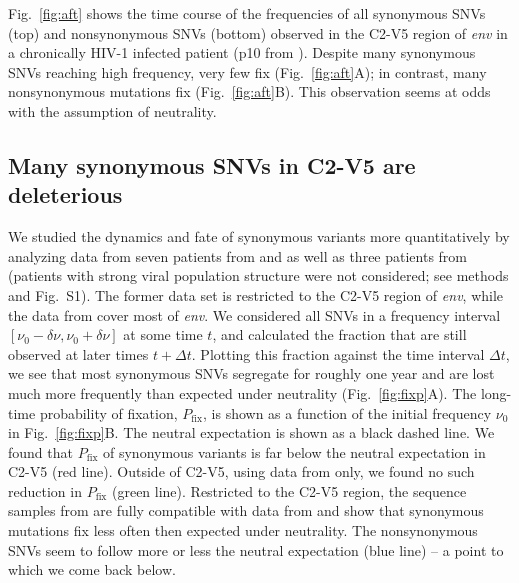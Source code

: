\documentclass[11pt]{article}
\newcommand{\pfix}{P_{\mathrm{fix}}}
\newcommand{\FIG}[1]{Fig.~\ref{fig:#1}}
\newcommand{\env}{\textit{env}}
\newcommand{\shankaregion}{C2-V5}
\newcommand{\PCApat}{1}
\begin{document}
\FIG{aft} shows the time course of the frequencies of all synonymous
SNVs (top) and nonsynonymous SNVs (bottom) observed in the
\shankaregion{} region of \env{} in a chronically HIV-1 infected patient (p10 from
\citet{shankarappa_consistent_1999}). Despite many synonymous SNVs
reaching high frequency, very few fix (Fig.~\ref{fig:aft}A); in
contrast, many nonsynonymous mutations fix
(Fig.~\ref{fig:aft}B). This observation seems at odds with
the assumption of neutrality.

\subsection*{Many synonymous SNVs in \shankaregion{} are deleterious}
We studied the dynamics and fate of synonymous variants more quantitatively by
analyzing data from seven patients from \citet{shankarappa_consistent_1999} and
\citet{liu_selection_2006} as well as three patients from
\citet{bunnik_autologous_2008} (patients with strong viral population structure
were not considered; see methods and Fig.~S\PCApat). The
former data set is restricted to the \shankaregion{} region of \env, while the
data from \citet{bunnik_autologous_2008} cover most of \env.  We considered all
SNVs in a frequency interval $[\nu_0-\delta\nu, \nu_0+\delta\nu]$ at some time
$t$, and calculated the fraction that are still observed at later times $t+\Delta
t$. Plotting this fraction against the time interval $\Delta t$, we see that
most synonymous SNVs segregate for roughly one year and are lost much more
frequently than expected under neutrality (Fig.~\ref{fig:fixp}A). The long-time
probability of fixation, $\pfix$, is shown as a function of the initial
frequency $\nu_0$ in Fig.~\ref{fig:fixp}B. The neutral expectation is
shown as a black dashed line. We found that $\pfix$ of synonymous
variants is far below the neutral expectation in \shankaregion{} (red line).
Outside of \shankaregion, using data from \citet{bunnik_autologous_2008} only,
we found no such reduction in $\pfix$ (green line). Restricted to the
\shankaregion{} region, the sequence samples from \citet{bunnik_autologous_2008}
are fully compatible with data from \citet{shankarappa_consistent_1999}
and show that synonymous mutations fix less often then expected under neutrality. The
nonsynonymous SNVs seem to follow more or less the neutral expectation (blue
line) -- a point to which we come back below.
\end{document}
